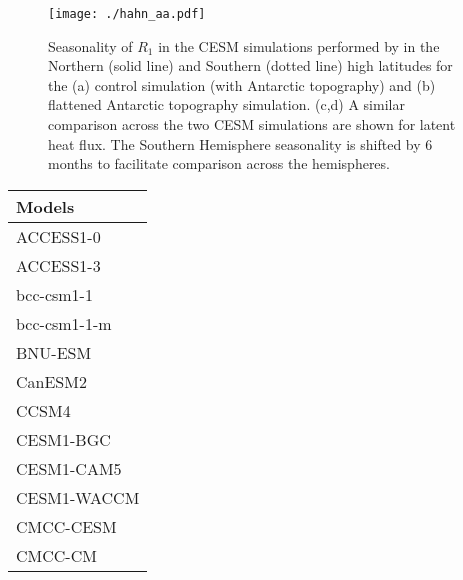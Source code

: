 \documentclass{ametsocV5}
\begin{document}
\begin{figure}[t]
    \noindent\texttt{[image: ./hahn\_aa.pdf]}\\
    \caption{Seasonality of $R_1$ in the CESM simulations performed by \cite{hahn2020} in the Northern (solid line) and Southern (dotted line) high latitudes for the (a) control simulation (with Antarctic topography) and (b) flattened Antarctic topography simulation. (c,d) A similar comparison across the two CESM simulations are shown for latent heat flux. The Southern Hemisphere seasonality is shifted by 6 months to facilitate comparison across the hemispheres.}
    \label{fig:hahn-aa}
\end{figure}


\begin{table}[t]
\begin{center}
  \renewcommand{\arraystretch}{1.0}
  \begin{tabular}{ l }
    Models          \\%
    \hline
    ACCESS1-0       \\%
    ACCESS1-3       \\%
    bcc-csm1-1      \\%
    bcc-csm1-1-m    \\%
    BNU-ESM         \\%
    CanESM2         \\%
    CCSM4           \\%
    CESM1-BGC       \\%
    CESM1-CAM5      \\%
    CESM1-WACCM     \\%
    CMCC-CESM       \\%
    CMCC-CM         \\%

\end{tabular}
\end{center}
\end{table}
\end{document}
